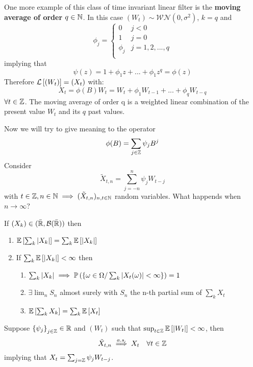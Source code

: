 \begin{definition}
    One more example of this class of time invariant linear filter is the \textbf{moving average of order $q\in\mathbb{N}$}. In this case $(W_t)\sim\mathcal{WN}(0,\sigma^2)$, $k=q$ and
    \[
        \phi_j=\begin{cases}
            0&j<0\\
            1&j=0\\
            \phi_j&j=1,2,...,q\\
        \end{cases}  
    \]
    implying that
    \[
        \psi(z)=1+\phi_1z+...+\phi_1z^q=\phi(z)  
    \]
    Therefore $\mathcal{L}\left[(W_t)\right]=(X_t)$ with:
    \[
        X_t=\phi(B)W_t=W_t+\phi_1W_{t-1}+...+\phi_qW_{t-q}
    \]
    $\forall t\in\mathbb{Z}$.
    The moving average of order q is a weighted linear combination of the present value $W_t$ and its $q$ past values. 
\end{definition}

Now we will try to give meaning to the operator
\[
    \phi(B)=\sum_{j\in\mathbb{Z}}\psi_jB^j  
\]
Consider
\[
    \tilde{X}_{t,n}=\sum_{j=-n}^n\psi_jW_{t-j}
\]
with $t\in\mathbb{Z}, n\in\mathbb{N}\implies(\tilde{X}_{t,n})_{n,t\in\mathbb{N}}$ random variables. What happends when $n\to\infty$?
\begin{lemma}
    If $(X_k)\in(\bar{\mathbb{R}}, \mathcal{B}(\bar{\mathbb{R}}))$ then
    \begin{enumerate}
        \item $\mathbb{E}\left[\sum_k\left|X_k\right|\right]=\sum_k\mathbb{E}\left[\left|X_k\right|\right]$
        \item If $\sum_k\mathbb{E}\left[\left|X_k\right|\right]<\infty$ then
            \begin{enumerate}
            \item $\sum_k\left|X_k\right|\implies\mathbb{P}\left(\left\{\omega\in\Omega/\sum_k\left|X_t(\omega)\right|<\infty\right\}\right)=1$
            \item $\exists\lim_nS_n$ almost surely with $S_n$ the n-th partial sum of $\sum_kX_t$
            \item $\mathbb{E}\left[\sum_kX_k\right]=\sum_k\mathbb{E}\left[X_t\right]$
        \end{enumerate}
    \end{enumerate} 
\end{lemma}

\begin{theorem}
    \label{theorem}
        Suppose $\left\{\psi_j\right\}_{j\in\mathbb{Z}}\in\mathbb{R}$ and $(W_t)$ such that $\sup_{t\in\mathbb{Z}}\mathbb{E}\left[\left|W_t\right|\right]<\infty$, then
        \[
            \tilde{X}_{t,n}\stackrel{a.s.}{\implies}X_t\ \ \ \forall t\in\Z  
        \]
        implying that $X_t=\sum_{j=\mathbb{Z}}\psi_jW_{t-j}$.
\end{theorem}

